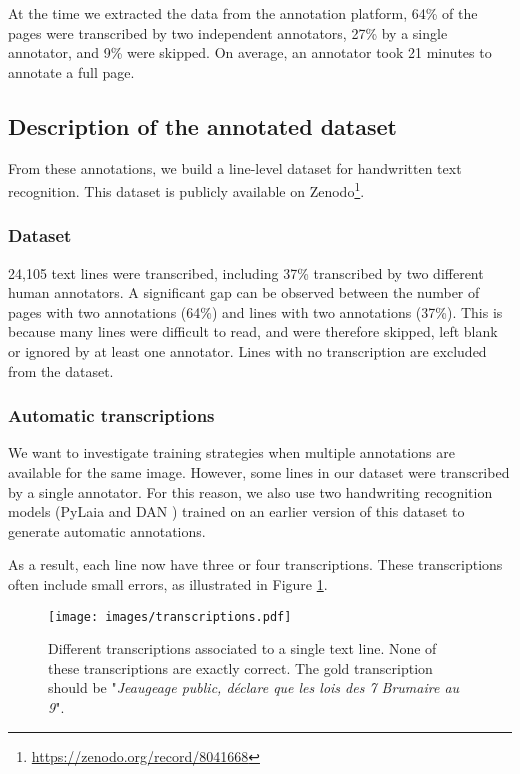 \documentclass[sigconf]{acmart}
\begin{document}
At the time we extracted the data from the annotation platform, 64\% of the pages were transcribed by two independent annotators, 27\% by a single annotator, and 9\% were skipped. On average, an annotator took 21 minutes to annotate a full page.

\subsection{Description of the annotated dataset}
From these annotations, we build a line-level dataset for handwritten text recognition. This dataset is publicly available on Zenodo\footnote{\url{https://zenodo.org/record/8041668}}.

\subsubsection{Dataset}
24,105 text lines were transcribed, including 37\% transcribed by two different human annotators. 
A significant gap can be observed between the number of pages with two annotations (64\%) and lines with two annotations (37\%). 
This is because many lines were difficult to read, and were therefore skipped, left blank or ignored by at least one annotator. 
Lines with no transcription are excluded from the dataset. 

\subsubsection{Automatic transcriptions}
We want to investigate training strategies when multiple annotations are available for the same image. However, some lines in our dataset were transcribed by a single annotator. For this reason, we also use two handwriting recognition models (PyLaia \cite{PyLaia} and DAN \cite{DAN}) trained on an earlier version of this dataset to generate automatic annotations. 

As a result, each line now have three or four transcriptions. These transcriptions often include small errors, as illustrated in Figure \ref{fig:transcriptions}. 

\begin{figure}[th!]
     \centering
     \texttt{[image: images/transcriptions.pdf]}
    \caption{Different transcriptions associated to a single text line. None of these transcriptions are exactly correct. The gold transcription should be "\textit{Jeaugeage public, déclare que les lois des 7 Brumaire au 9}".}
    \label{fig:transcriptions}
\end{figure}
\end{document}
